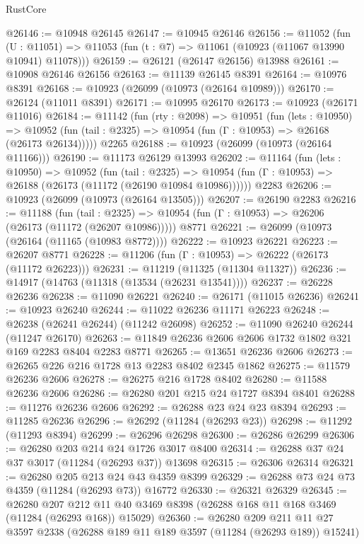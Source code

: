 \begin{lexlean}{RustCore}
\begin{coremodule}
@26146 := @10948 @26145
@26147 := @10945 @26146
@26156 := @11052
    (fun (U : @11051) => @11053 (fun (t : @7) => @11061 (@10923 (@11067 @13990 @10941) @11078)))
@26159 := @26121 (@26147 @26156) @13988
@26161 := @10908 @26146 @26156
@26163 := @11139 @26145 @8391
@26164 := @10976 @8391
@26168 := @10923 (@26099 (@10973 (@26164 @10989)))
@26170 := @26124 (@11011 @8391)
@26171 := @10995 @26170
@26173 := @10923 (@26171 @11016)
@26184 := @11142
    (fun (rty : @2098) =>
    @10951
      (fun (lets : @10950) =>
      @10952 (fun (tail : @2325) => @10954 (fun (Γ : @10953) => @26168 (@26173 @26134)))))
    @2265
@26188 := @10923 (@26099 (@10973 (@26164 @11166)))
@26190 := @11173 @26129 @13993
@26202 := @11164
    (fun (lets : @10950) =>
    @10952
      (fun (tail : @2325) =>
      @10954 (fun (Γ : @10953) => @26188 (@26173 (@11172 (@26190 @10984 @10986))))))
    @2283
@26206 := @10923 (@26099 (@10973 (@26164 @13505)))
@26207 := @26190 @2283
@26216 := @11188
    (fun (tail : @2325) => @10954 (fun (Γ : @10953) => @26206 (@26173 (@11172 (@26207 @10986)))))
    @8771
@26221 := @26099 (@10973 (@26164 (@11165 (@10983 @8772))))
@26222 := @10923 @26221
@26223 := @26207 @8771
@26228 := @11206 (fun (Γ : @10953) => @26222 (@26173 (@11172 @26223)))
@26231 := @11219 (@11325 (@11304 @11327))
@26236 := @14917 (@14763 (@11318 (@13534 (@26231 @13541))))
@26237 := @26228 @26236
@26238 := @11090 @26221
@26240 := @26171 (@11015 @26236)
@26241 := @10923 @26240
@26244 := @11022 @26236 @11171 @26223
@26248 := @26238 (@26241 @26244) (@11242 @26098)
@26252 := @11090 @26240 @26244 (@11247 @26170)
@26263 := @11849 @26236 @2606 @2606 @1732 @1802 @321 @169 @2283 @8404 @2283 @8771
@26265 := @13651 @26236 @2606
@26273 := @26265 @226 @216 @1728 @13 @2283 @8402 @2345 @1862
@26275 := @11579 @26236 @2606
@26278 := @26275 @216 @1728 @8402
@26280 := @11588 @26236 @2606
@26286 := @26280 @201 @215 @24 @1727 @8394 @8401
@26288 := @11276 @26236 @2606
@26292 := @26288 @23 @24 @23 @8394
@26293 := @11285 @26236
@26296 := @26292 (@11284 (@26293 @23))
@26298 := @11292 (@11293 @8394)
@26299 := @26296 @26298
@26300 := @26286 @26299
@26306 := @26280 @203 @214 @24 @1726 @3017 @8400
@26314 := @26288 @37 @24 @37 @3017 (@11284 (@26293 @37)) @13698
@26315 := @26306 @26314
@26321 := @26280 @205 @213 @24 @43 @4359 @8399
@26329 := @26288 @73 @24 @73 @4359 (@11284 (@26293 @73)) @16772
@26330 := @26321 @26329
@26345 := @26280
    @207
    @212
    @11
    @40
    @3469
    @8398
    (@26288 @168 @11 @168 @3469 (@11284 (@26293 @168)) @15029)
@26360 := @26280
    @209
    @211
    @11
    @27
    @3597
    @2338
    (@26288 @189 @11 @189 @3597 (@11284 (@26293 @189)) @15241)

\end{coremodule}
\end{lexlean}
